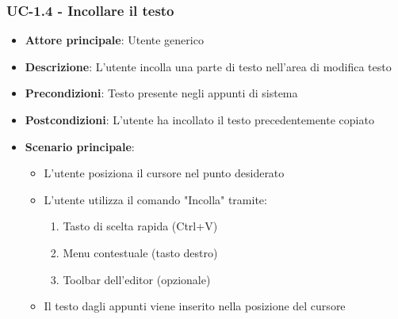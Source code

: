 \documentclass[11pt,a4paper]{article}
\begin{document}
\subsubsection{UC-1.4 - Incollare il testo}
\begin{itemize}
    \item \textbf{Attore principale}: Utente generico
    \item \textbf{Descrizione}: L'utente incolla una parte di testo nell'area di modifica testo
    \item \textbf{Precondizioni}: Testo presente negli appunti di sistema
    \item \textbf{Postcondizioni}: L'utente ha incollato il testo precedentemente copiato
    \item \textbf{Scenario principale}:
        \begin{itemize}
            \item L'utente posiziona il cursore nel punto desiderato
            \item L'utente utilizza il comando "Incolla" tramite:
                \begin{enumerate}
                    \item Tasto di scelta rapida (Ctrl+V)
                    \item Menu contestuale (tasto destro)
                    \item Toolbar dell'editor (opzionale)
                \end{enumerate}
            \item Il testo dagli appunti viene inserito nella posizione del cursore
        \end{itemize}
\end{itemize}
\end{document}
